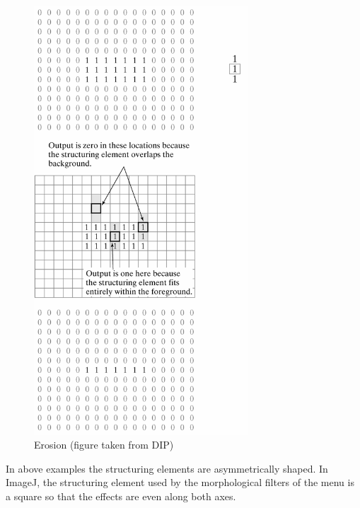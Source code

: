 \begin{figure}[htbp]
\begin{center}
\includegraphics[width=8cm]{fig/CMCIBasicCourse201102-img66.png}
\caption{ Erosion (figure taken from DIP)}
\label{fig:img66}
\end{center}
\end{figure}

In above examples the structuring elements are asymmetrically shaped. In
ImageJ, the structuring element used by the morphological filters of the  menu is a square so that the
effects are even along both axes. 

